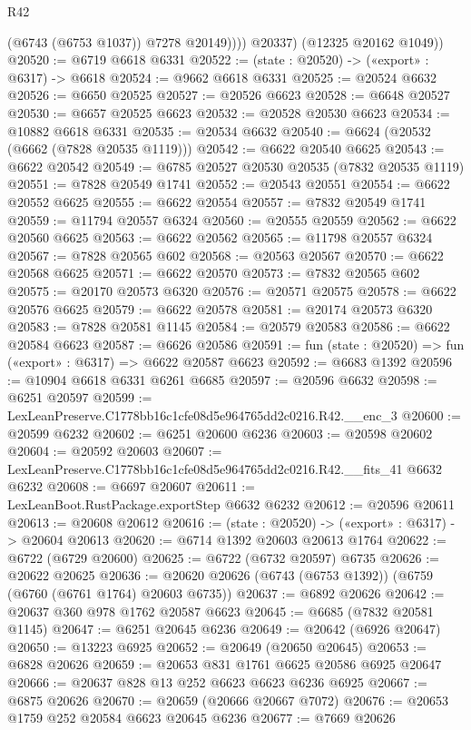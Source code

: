 \begin{lexlean}{R42}
\begin{coremodule}
{                (@6743 (@6753 @1037))
                @7278
                @20149))))
        @20337)
      (@12325 @20162 @1049))
@20520 := @6719 @6618 @6331
@20522 := (state : @20520) -> («export» : @6317) -> @6618
@20524 := @9662 @6618 @6331
@20525 := @20524 @6632
@20526 := @6650 @20525
@20527 := @20526 @6623
@20528 := @6648 @20527
@20530 := @6657 @20525 @6623
@20532 := @20528 @20530 @6623
@20534 := @10882 @6618 @6331
@20535 := @20534 @6632
@20540 := @6624 (@20532 (@6662 (@7828 @20535 @1119)))
@20542 := @6622 @20540 @6625
@20543 := @6622 @20542
@20549 := @6785 @20527 @20530 @20535 (@7832 @20535 @1119)
@20551 := @7828 @20549 @1741
@20552 := @20543 @20551
@20554 := @6622 @20552 @6625
@20555 := @6622 @20554
@20557 := @7832 @20549 @1741
@20559 := @11794 @20557 @6324
@20560 := @20555 @20559
@20562 := @6622 @20560 @6625
@20563 := @6622 @20562
@20565 := @11798 @20557 @6324
@20567 := @7828 @20565 @602
@20568 := @20563 @20567
@20570 := @6622 @20568 @6625
@20571 := @6622 @20570
@20573 := @7832 @20565 @602
@20575 := @20170 @20573 @6320
@20576 := @20571 @20575
@20578 := @6622 @20576 @6625
@20579 := @6622 @20578
@20581 := @20174 @20573 @6320
@20583 := @7828 @20581 @1145
@20584 := @20579 @20583
@20586 := @6622 @20584 @6623
@20587 := @6626 @20586
@20591 := fun (state : @20520) => fun («export» : @6317) => @6622 @20587 @6623
@20592 := @6683 @1392
@20596 := @10904 @6618 @6331 @6261 @6685
@20597 := @20596 @6632
@20598 := @6251 @20597
@20599 := LexLeanPreserve.C1778bb16c1cfe08d5e964765dd2c0216.R42.__enc_3
@20600 := @20599 @6232
@20602 := @6251 @20600 @6236
@20603 := @20598 @20602
@20604 := @20592 @20603
@20607 := LexLeanPreserve.C1778bb16c1cfe08d5e964765dd2c0216.R42.__fits_41 @6632 @6232
@20608 := @6697 @20607
@20611 := LexLeanBoot.RustPackage.exportStep @6632 @6232
@20612 := @20596 @20611
@20613 := @20608 @20612
@20616 := (state : @20520) -> («export» : @6317) -> @20604 @20613
@20620 := @6714 @1392 @20603 @20613 @1764
@20622 := @6722 (@6729 @20600)
@20625 := @6722 (@6732 @20597) @6735
@20626 := @20622 @20625
@20636 := @20620 @20626 (@6743 (@6753 @1392)) (@6759 (@6760 (@6761 @1764) @20603 @6735))
@20637 := @6892 @20626
@20642 := @20637 @360 @978 @1762 @20587 @6623
@20645 := @6685 (@7832 @20581 @1145)
@20647 := @6251 @20645 @6236
@20649 := @20642 (@6926 @20647)
@20650 := @13223 @6925
@20652 := @20649 (@20650 @20645)
@20653 := @6828 @20626
@20659 := @20653 @831 @1761 @6625 @20586 @6925 @20647
@20666 := @20637 @828 @13 @252 @6623 @6623 @6236 @6925
@20667 := @6875 @20626
@20670 := @20659 (@20666 @20667 @7072)
@20676 := @20653 @1759 @252 @20584 @6623 @20645 @6236
@20677 := @7669 @20626
}
\end{coremodule}
\end{lexlean}
